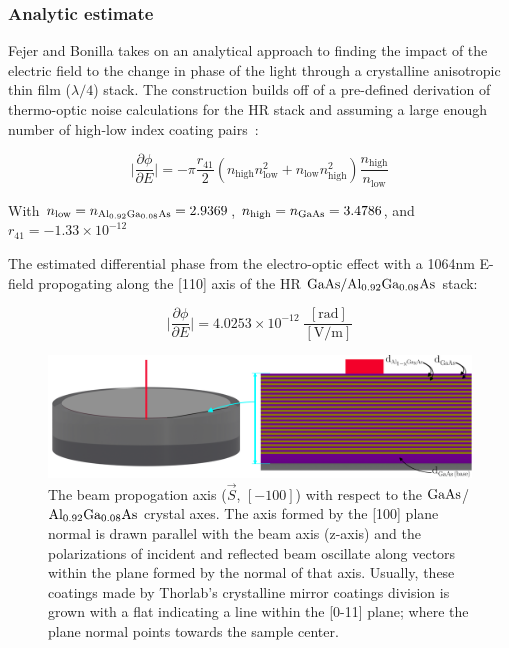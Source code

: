 \subsubsection*{Analytic estimate}
Fejer and Bonilla takes on an analytical approach to finding the impact of the electric field to the change in phase of the light through a crystalline anisotropic thin film ($\lambda/4$) stack. The construction builds off of a pre-defined derivation of thermo-optic noise calculations for the HR stack and assuming a large enough number of high-low index coating pairs~\cite{bonillafejer, fejer_estimate}:

\begin{equation}
    \bigg| \frac{\partial \phi}{\partial E} \bigg| = - \pi \frac{r_{41}}{2}(n_\mathrm{high} n_\mathrm{low} ^2 + n_\mathrm{low} n_\mathrm{high} ^2) \frac{n_\mathrm{high}}{n_\mathrm{low}}
\end{equation}

With $n_\mathrm{low} = n_{\mathrm{Al_{0.92}Ga_{0.08}As}} = 2.9369$, $n_\mathrm{high} = n_{\mathrm{GaAs}} = 3.4786$, and $r_{41} = -1.33 \times 10^{-12}$

The estimated differential phase from the electro-optic effect with a 1064nm E-field propogating along the [110] axis of the HR $\mathrm{GaAs} / \mathrm{Al_{0.92}Ga_{0.08}As}$ stack:

$$
\bigg| \frac{\partial \phi}{\partial E} \bigg| = 4.0253 \times 10^{-12} \; \frac{[\mathrm{rad}]}{[\mathrm{V}/\mathrm{m}]}
$$



\begin{figure}[!ht]
	\includegraphics[width=\textwidth]{figs/ALGAAS/ALGAAS_HR_layers_ann.pdf}
\caption{The beam propogation axis ($\vec{S}$, $[-100]$) with respect to the $\mathrm{GaAs}$/$\mathrm{Al_{0.92}Ga_{0.08}As}$ crystal axes. The axis formed by the [100] plane normal is drawn parallel with the beam axis (z-axis) and the polarizations of incident and reflected beam oscillate along vectors within the plane formed by the normal of that axis. Usually, these coatings made by Thorlab's crystalline mirror coatings division is grown with a flat indicating a line within the [0-11] plane; where the plane normal points towards the sample center.}
\label{fig:HRlayers}
\end{figure}


